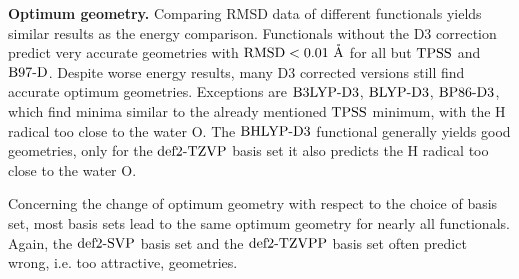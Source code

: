\textbf{Optimum geometry.} Comparing RMSD data of different functionals yields similar results as the energy comparison.
Functionals without the D3 correction
predict very accurate geometries with \mbox{$\text{RMSD} < 0.01\ \mathring{\text{A}}$} for all but
$\text{TPSS}$ and $\text{B97-D}$.
Despite worse energy results, many D3 corrected versions still find accurate optimum geometries.
Exceptions are $\text{B3LYP}\text{-D3}$, $\text{BLYP}\text{-D3}$, $\text{BP86}\text{-D3}$, which find minima similar
to the already mentioned $\text{TPSS}$ minimum, with the H radical too close to the
water O.
The $\text{BHLYP}\text{-D3}$ functional generally yields good geometries, only for the
$\text{def2-TZVP}$ basis set it also predicts the H radical too close to the water O.

Concerning the change of optimum geometry with respect to the choice of basis
set, most basis sets lead to the same optimum geometry for nearly all
functionals. Again, the \mbox{$\text{def2-SVP}$} basis set and the $\text{def2-TZVPP}$ basis set often
predict wrong, i.e. too attractive, geometries. 

% 

